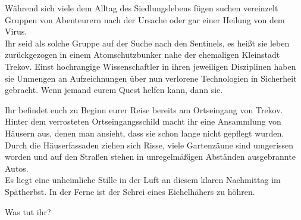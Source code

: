 Während sich viele dem Alltag des Siedlungslebens fügen suchen vereinzelt Gruppen von Abenteurern nach der Ursache oder gar einer Heilung von dem Virus.
\\Ihr seid als solche Gruppe auf der Suche nach den Sentinels, es heißt sie leben zurückgezogen in einem Atomschutzbunker nahe der ehemaligen Kleinstadt Trekov. Einst hochrangige Wissenschaftler in ihren jeweiligen Disziplinen haben sie Unmengen an Aufzeichnungen über nun verlorene Technologien in Sicherheit gebracht. Wenn jemand eurem Quest helfen kann, dann sie.

Ihr befindet euch zu Beginn eurer Reise bereits am Ortseingang von Trekov. Hinter dem verrosteten Ortseingangsschild macht ihr eine Ansammlung von Häusern aus, denen man ansieht, dass sie schon lange nicht gepflegt wurden.
\\Durch die Häuserfassaden ziehen sich Risse, viele Gartenzäune sind umgerissen worden und auf den Straßen stehen in unregelmäßigen Abständen ausgebrannte Autos.
\\Es liegt eine unheimliche Stille in der Luft an diesem klaren Nachmittag im Spätherbst. In der Ferne ist der Schrei eines Eichelhähers zu höhren.

Was tut ihr?
